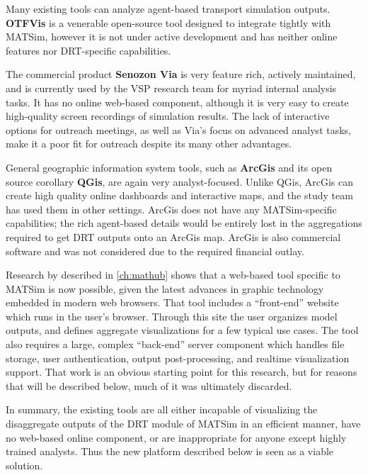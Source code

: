 Many existing tools can analyze agent-based transport simulation outputs. \textbf{OTFVis} \cite{Srippgen2015OTFVisInBook} is a venerable open-source tool designed to integrate tightly with MATSim, however it is not under active development and has neither online features nor DRT-specific capabilities.

The commercial product \textbf{Senozon Via} \cite{Rieser2015SenozonViaInBook} is very feature rich, actively maintained, and is currently used by the VSP research team for myriad internal analysis tasks. It has no online web-based component, although it is very easy to create high-quality screen recordings of simulation results. The lack of interactive options for outreach meetings, as well as Via's focus on advanced analyst tasks, make it a poor fit for outreach despite its many other advantages.

General geographic information system tools, such as \textbf{ArcGis} and its open source corollary \textbf{QGis}, are again very analyst-focused. Unlike QGis, ArcGis can create high quality online dashboards and interactive maps, and the study team has used them in other settings. ArcGis does not have any MATSim-specific capabilities; the rich agent-based details would be entirely lost in the aggregations required to get DRT outputs onto an ArcGis map. ArcGis is also commercial software and was not considered due to the required financial outlay.

Research by \citet{CharltonLaudan2020WebBasedVisualization} described in \autoref{ch:mathub} shows that a web-based tool specific to MATSim is now possible, given the latest advances in graphic technology embedded in modern web browsers. That tool includes a ``front-end'' website which runs in the user's browser. Through this site the user organizes model outputs, and defines aggregate visualizations for a few typical use cases. The tool also requires a large, complex ``back-end'' server component which handles file storage, user authentication, output post-processing, and realtime visualization support. That work is an obvious starting point for this research, but for reasons that will be described below, much of it was ultimately discarded.

In summary, the existing tools are all either incapable of visualizing the disaggregate outputs of the DRT module of MATSim in an efficient manner, have no web-based online component, or are inappropriate for anyone except highly trained analysts. Thus the new platform described below is seen as a viable solution.

